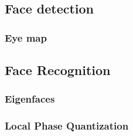 \lipsum[10]
\subsection{Face detection}
\subsubsection{Eye map}
\label{sub:FaceDetection}


\subsection{Face Recognition}
\label{sub:FaceRecognition}


\subsubsection{Eigenfaces}
\label{subs:Eigenfaces}


\subsubsection{Local Phase Quantization}
\label{subs:LocalPhaseQuantization}

